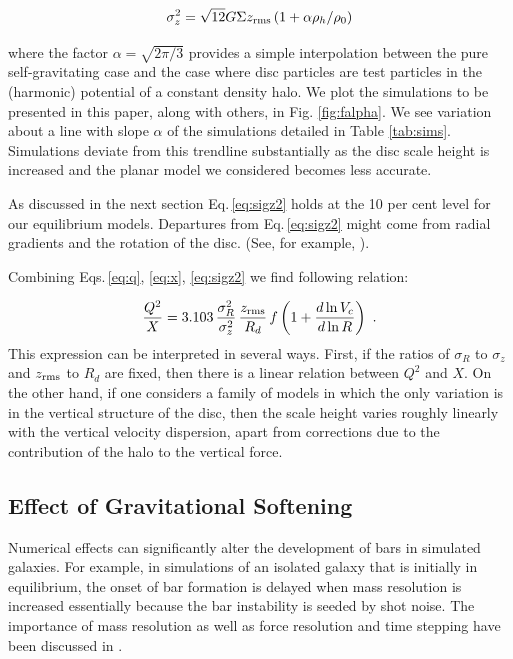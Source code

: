 \begin{equation}\label{eq:sigz2}
\sigma_z^2 = \sqrt{12} 
G\Sigma z_{\rm rms} \left (1 + \alpha\rho_h/\rho_0\right )
\end{equation}

\noindent where the factor $\alpha = \sqrt{2\pi/3}$ provides a
simple interpolation between the pure self-gravitating case and the
case where disc particles are test particles in the (harmonic)
potential of a constant density halo.  {We plot the simulations to 
be presented in this paper, along with others, in Fig. \ref{fig:falpha}.
We see variation about a line with slope $\alpha$ of the simulations
detailed in Table \ref{tab:sims}. Simulations deviate from this trendline
substantially as the disc scale height is increased and the planar model
we considered becomes less accurate.}

As discussed in the next
section Eq.\,\ref{eq:sigz2} holds at the 10 per cent level for our
equilibrium models.  Departures from Eq.\,\ref{eq:sigz2} might come
from radial gradients and the rotation of the disc. (See, for example,
\citet{read2014}).

Combining Eqs.\,\ref{eq:q}, \ref{eq:x}, \ref{eq:sigz2} we find 
following relation:

\begin{equation}\label{eq:r}
\frac{Q^2}{X} = 3.103 \,
\frac{\sigma_R^2}{\sigma_z^2} \,
\frac{z_{\rm rms}}{R_d}\,
f\left (1 + \frac{d\ln V_c}{d\ln R}\right )~.
\end{equation}
\noindent This expression can be interpreted in several ways.  First,
if the ratios of $\sigma_R$ to $\sigma_z$ and $z_{\rm rms}$ to $R_d$ are
fixed, then there is a linear relation between $Q^2$ and $X$.  On the
other hand, if one considers a family of models in which the only
variation is in the vertical structure of the disc, then the scale
height varies roughly linearly with the vertical velocity dispersion,
apart from corrections due to the contribution of the halo to the
vertical force.

\subsection{Effect of Gravitational Softening} 

Numerical effects can significantly alter the development of bars in
simulated galaxies. For example, in simulations of an isolated galaxy
that is initially in equilibrium, the onset of bar formation is
delayed when mass resolution is increased \citep{dbs2009}
essentially because the bar instability is seeded by shot noise.  The
importance of mass resolution as well as force resolution and time
stepping have been discussed in \citet{Klypin2009}.

